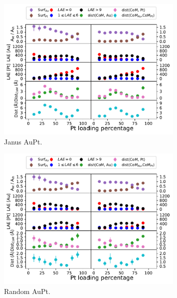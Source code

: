 \begin{figure}
    \centering
    \includegraphics[width=0.8\textwidth]{figures/MD/Alloys/Janus_Au-Pt.pdf}
    \caption{Janus AuPt.}
    \label{fig:AuPtJan_Dyn}
\end{figure}

\begin{figure}
    \centering
    \includegraphics[width=0.8\textwidth]{figures/MD/Alloys/Random_Au-Pt.pdf}
    \caption{Random AuPt.}
    \label{fig:AuPtRnd_Dyn}
\end{figure}


